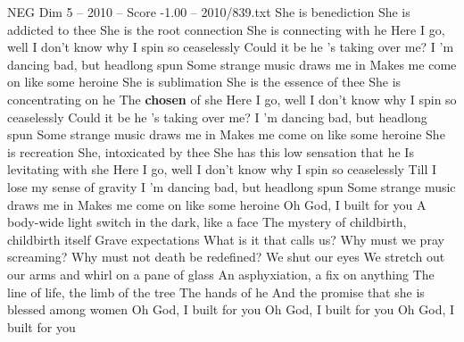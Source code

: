 \begin{textsample}{NEG Dim 5 – 2010 – Score -1.00 – 2010/839.txt}  \label{ex:f5_neg_006}
She is benediction She is addicted to thee She is the root connection She is connecting with he Here I go, well I don't know why I spin so ceaselessly Could it be he 's taking over me?
I 'm dancing bad, but headlong spun Some strange music draws me in Makes me come on like some heroine She is sublimation She is the essence of thee She is concentrating on he The \textbf{chosen} of she Here I go, well I don't know why I spin so ceaselessly Could it be he 's taking over me?
I 'm dancing bad, but headlong spun Some strange music draws me in Makes me come on like some heroine She is recreation She, intoxicated by thee She has this low sensation that he Is levitating with she Here I go, well I don't know why I spin so ceaselessly Till I lose my sense of gravity I 'm dancing bad, but headlong spun Some strange music draws me in Makes me come on like some heroine Oh God, I built for you A body-wide light switch in the dark, like a face The mystery of childbirth, childbirth itself Grave expectations What is it that calls us?
Why must we pray screaming?
Why must not death be redefined?
We shut our eyes We stretch out our arms and whirl on a pane of glass An asphyxiation, a fix on anything The line of life, the limb of the tree The hands of he And the promise that she is blessed among women Oh God, I built for you Oh God, I built for you Oh God, I built for you

\end{textsample}
